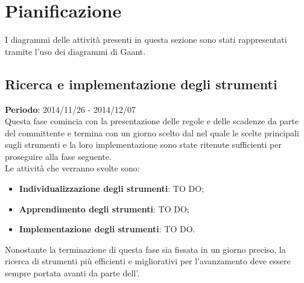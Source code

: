%


\section{Pianificazione} %
\label{sec:pianificazione}
I diagrammi delle attività presenti in questa sezione sono stati rappresentati tramite l'uso dei diagrammi di Gaant.
	\subsection{Ricerca e implementazione degli strumenti} %
	\label{sub:ricerca_e_implementazione_degli_strumenti}
	\textbf{Periodo}: 2014/11/26 - 2014/12/07 \\
	Questa fase comincia con la presentazione delle regole e delle scadenze da parte del committente e termina con un giorno scelto dal \roleProjectManager{} nel quale le scelte principali sugli strumenti e la loro implementazione sono state ritenute sufficienti per proseguire alla fase seguente. \\
	Le attività che verranno svolte sono:
		\begin{itemize}
			\item \textbf{Individualizzazione degli strumenti}: TO DO;
			\item \textbf{Apprendimento degli strumenti}: TO DO;
			\item \textbf{Implementazione degli strumenti}: TO DO.
		\end{itemize}
	\noindent
	Nonostante la terminazione di questa fase sia fissata in un giorno preciso, la ricerca di strumenti più efficienti e migliorativi per l'avanzamento deve essere sempre portata avanti da parte dell'\roleAdministrator.
	 
